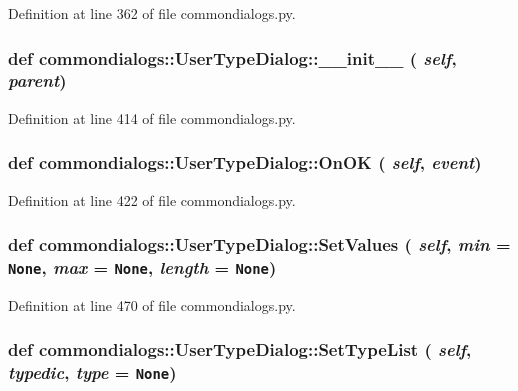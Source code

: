 Definition at line 362 of file commondialogs.py.\hypertarget{classcommondialogs_1_1UserTypeDialog_409b6ac806b2ae0e2ac4c4c4aa6baeb5}{
\subsubsection[\_\-\_\-init\_\-\_\-]{\setlength{\rightskip}{0pt plus 5cm}def commondialogs::User\-Type\-Dialog::\_\-\_\-init\_\-\_\- ( {\em self},  {\em parent})}}
\label{classcommondialogs_1_1UserTypeDialog_409b6ac806b2ae0e2ac4c4c4aa6baeb5}




Definition at line 414 of file commondialogs.py.\hypertarget{classcommondialogs_1_1UserTypeDialog_3af71ea699d83da41fee2a2fbf1f55e3}{
\subsubsection[OnOK]{\setlength{\rightskip}{0pt plus 5cm}def commondialogs::User\-Type\-Dialog::On\-OK ( {\em self},  {\em event})}}
\label{classcommondialogs_1_1UserTypeDialog_3af71ea699d83da41fee2a2fbf1f55e3}




Definition at line 422 of file commondialogs.py.\hypertarget{classcommondialogs_1_1UserTypeDialog_45bfdc62e0cdb882229682f2cfbe5c08}{
\subsubsection[SetValues]{\setlength{\rightskip}{0pt plus 5cm}def commondialogs::User\-Type\-Dialog::Set\-Values ( {\em self},  {\em min} = {\tt None},  {\em max} = {\tt None},  {\em length} = {\tt None})}}
\label{classcommondialogs_1_1UserTypeDialog_45bfdc62e0cdb882229682f2cfbe5c08}




Definition at line 470 of file commondialogs.py.\hypertarget{classcommondialogs_1_1UserTypeDialog_4e5316d45310d70691958ec898a8427c}{
\subsubsection[SetTypeList]{\setlength{\rightskip}{0pt plus 5cm}def commondialogs::User\-Type\-Dialog::Set\-Type\-List ( {\em self},  {\em typedic},  {\em type} = {\tt None})}}
\label{classcommondialogs_1_1UserTypeDialog_4e5316d45310d70691958ec898a8427c}




